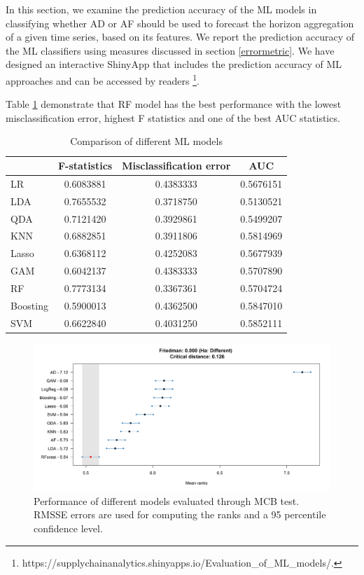 \documentclass[]{elsarticle} %
\begin{document}
In this section, we examine the prediction accuracy of the ML models in
classifying whether AD or AF should be used to forecast the horizon
aggregation of a given time series, based on its features. We report the
prediction accuracy of the ML classifiers using measures discussed in
section \ref{errormetric}. We have designed an interactive ShinyApp that
includes the prediction accuracy of ML approaches and can be accessed by
readers \footnote{https://supplychainanalytics.shinyapps.io/Evaluation\_of\_ML\_models/.}.

Table \ref{tab:cost} demonstrate that RF model has the best performance
with the lowest misclassification error, highest F statistics and one of
the best AUC statistics.

\begin{table}
\caption{\label{tab:cost}Comparison of different ML models}
\centering
\begin{tabular}[t]{lccc}
\hline
 & F-statistics & Misclassification error & AUC\\
\hline
LR &  0.6083881 &  0.4383333 & 0.5676151\\
\hline
LDA & 0.7655532 & 0.3718750 & 0.5130521\\
\hline
QDA &  0.7121420 & 0.3929861 & 0.5499207\\
\hline
KNN &  0.6882851 & 0.3911806 & 0.5814969\\
\hline
Lasso & 0.6368112 & 0.4252083 & 0.5677939\\
\hline
GAM &  0.6042137 & 0.4383333 & 0.5707890\\
\hline
RF & 0.7773134 & 0.3367361 & 0.5704724\\
\hline
Boosting & 0.5900013 & 0.4362500 & 0.5847010\\
\hline
SVM & 0.6622840 & 0.4031250 & 0.5852111\\
\hline
\end{tabular}
\end{table}

\begin{figure}[H]

{\centering \includegraphics[width=1\linewidth]{img/300dpi/Fig_MCB_all} 

}

\caption{Performance of different models evaluated through MCB test. RMSSE errors are used for computing the ranks and a 95 percentile confidence level.}\label{fig:MCB_ML}
\end{figure}
\end{document}
